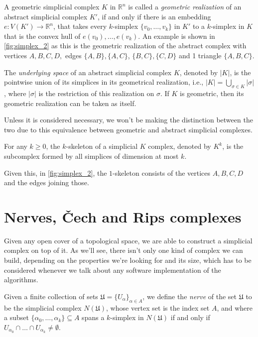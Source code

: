 A geometric simplicial complex $K$ in $\mathbb{R}^{n}$ is called a \textit{geometric realization} of an abstract simplicial complex $K'$, if and only if there is an embedding $e: V(K') \to \mathbb{R}^{n}$, that takes every $k$-simplex $\{v_{0}, \ldots, v_{k}\}$ in $K'$ to a $k$-simplex in $K$ that is the convex hull of $e(v_{0}), \ldots, e(v_{k})$. An example is shown in \ref{fig:simplex_2} as this is the geometric realization of the abstract complex with vertices $A,B,C,D,$ edges $\{A,B\}, \{A,C\}$,
$\{B,C\}, \{C,D\}$ and 1 triangle $\{A,B,C\}$.

\begin{definition}
  The \textit{underlying space} of an abstract simplicial complex $K$, denoted by $|K|$, is the pointwise union of its simplices in its geometrical realization, i.e., $|K| = \bigcup_{\sigma \in K}|\sigma|$, where $|\sigma|$ is the restriction of this realization on $\sigma$. If $K$ is geometric, then its geometric realization can be taken as itself.
\end{definition}

Unless it is considered necessary, we won't be making the distinction between the two due to this equivalence between geometric and abstract simplicial complexes.

\begin{definition}[$k$-skeleton]
  For any $k \geq 0$, the $k$-skeleton of a simplicial $K$ complex, denoted by $K^{k}$, is the subcomplex formed by all simplices of dimension at most $k$.
\end{definition}
Given this, in \ref{fig:simplex_2}, the $1$-skeleton consists of the vertices $A,B,C,D$ and the edges joining those.

\section{Nerves, Čech and Rips complexes}
Given any open cover of a topological space, we are able to construct a simplicial complex on top of it. As we'll see, there isn't only one kind of complex we can build, depending on the properties we're looking for and its size, which has to be considered whenever we talk about any software implementation of the algorithms.

\begin{definition}[Nerve]
  Given a finite collection of sets $\mathfrak{U} = \{U_{\alpha}\}_{\alpha \in A}$, we define the \textit{nerve} of the set $\mathfrak{U}$ to be the simplicial complex $N(\mathfrak{U})$, whose vertex set is the index set $A$, and where a subset $\{\alpha_{0}, \ldots, \alpha_{k}\} \subseteq A$ spans a $k$-simplex in $N(\mathfrak{U})$ if and only if $U_{\alpha_{0}} \cap \ldots \cap U_{\alpha_{k}} \ne \emptyset$.
\end{definition}

